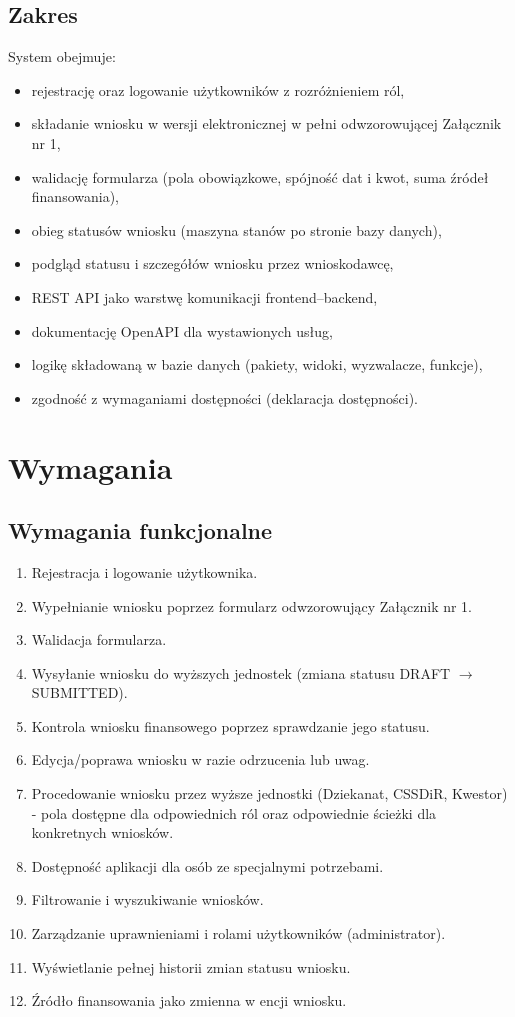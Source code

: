 \documentclass[12pt,a4paper]{article}
\begin{document}
\subsection{Zakres}
System obejmuje:
\begin{itemize}[leftmargin=*]
  \item rejestrację oraz logowanie użytkowników z rozróżnieniem ról,
  \item składanie wniosku w wersji elektronicznej w pełni odwzorowującej Załącznik nr 1,
  \item walidację formularza (pola obowiązkowe, spójność dat i kwot, suma źródeł finansowania),
  \item obieg statusów wniosku (maszyna stanów po stronie bazy danych),
  \item podgląd statusu i szczegółów wniosku przez wnioskodawcę,
  \item REST API jako warstwę komunikacji frontend--backend,
  \item dokumentację OpenAPI dla wystawionych usług,
  \item logikę składowaną w bazie danych (pakiety, widoki, wyzwalacze, funkcje),
  \item zgodność z wymaganiami dostępności (deklaracja dostępności).
\end{itemize}

\section{Wymagania}
\label{sec:wymagania}

\subsection{Wymagania funkcjonalne}
\begin{enumerate}[leftmargin=*]
  \item Rejestracja i logowanie użytkownika.
  \item Wypełnianie wniosku poprzez formularz odwzorowujący Załącznik nr 1.
  \item Walidacja formularza.
  \item Wysyłanie wniosku do wyższych jednostek (zmiana statusu DRAFT $\to$ SUBMITTED).
  \item Kontrola wniosku finansowego poprzez sprawdzanie jego statusu.
  \item Edycja/poprawa wniosku w razie odrzucenia lub uwag.
  \item Procedowanie wniosku przez wyższe jednostki (Dziekanat, CSSDiR, Kwestor) - pola
        dostępne dla odpowiednich ról oraz odpowiednie ścieżki dla konkretnych wniosków.
  \item Dostępność aplikacji dla osób ze specjalnymi potrzebami.
  \item Filtrowanie i wyszukiwanie wniosków.
  \item Zarządzanie uprawnieniami i rolami użytkowników (administrator).
  \item Wyświetlanie pełnej historii zmian statusu wniosku.
  \item Źródło finansowania jako zmienna w encji wniosku.
\end{enumerate}
\end{document}
